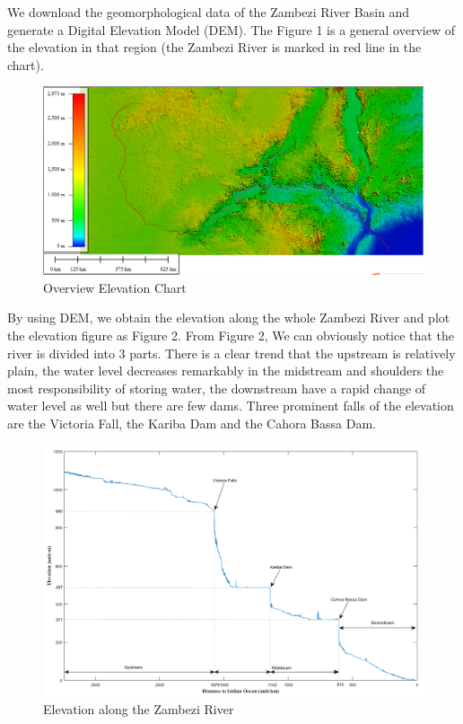 \documentclass{mcmthesis}
\begin{document}
We download the geomorphological data of the Zambezi River Basin and generate a Digital Elevation Model (DEM). The Figure 1 is a general overview of the elevation in that region (the Zambezi River is marked in red line in the chart).\\
\begin{figure}[h]
\small
\centering
\includegraphics[width=14cm]{./figures/Sensing_Figure.png}
\caption{Overview Elevation Chart} \label{fig:Fig1}
\end{figure}
By using DEM, we obtain the elevation along the whole Zambezi River and plot the elevation figure as Figure 2. From Figure 2, We can obviously notice that the river is divided into 3 parts. There is a clear trend that the upstream is relatively plain, the water level decreases remarkably in the midstream and shoulders the most responsibility of storing water, the downstream have a rapid change of water level as well but there are few dams. Three prominent falls of the elevation are the Victoria Fall, the Kariba Dam and the Cahora Bassa Dam.

\begin{figure}[h]
\small
\centering
\includegraphics[width=14cm]{./figures/dis_alti_v3.png}
\caption{Elevation along the Zambezi River} \label{fig:Fig2}
\end{figure}
\end{document}
